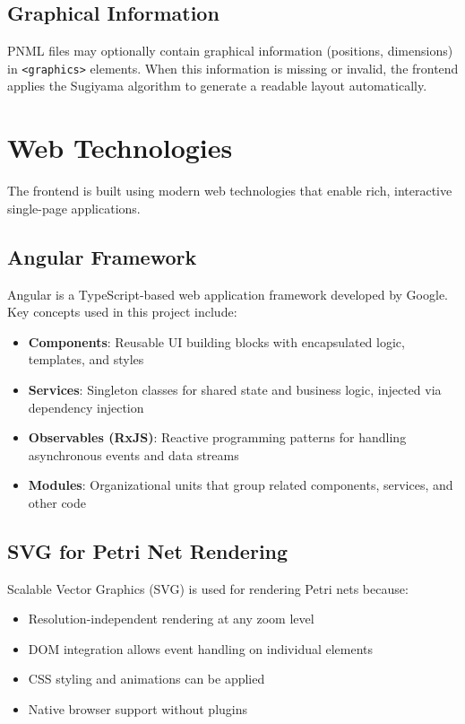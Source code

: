 \subsection{Graphical Information}

PNML files may optionally contain graphical information (positions, dimensions) in \texttt{<graphics>} elements. When this information is missing or invalid, the frontend applies the Sugiyama algorithm to generate a readable layout automatically.

\section{Web Technologies}
\label{sec:web-technologies}

The frontend is built using modern web technologies that enable rich, interactive single-page applications.

\subsection{Angular Framework}

Angular is a TypeScript-based web application framework developed by Google. Key concepts used in this project include:

\begin{itemize}
    \item \textbf{Components}: Reusable UI building blocks with encapsulated logic, templates, and styles
    \item \textbf{Services}: Singleton classes for shared state and business logic, injected via dependency injection
    \item \textbf{Observables (RxJS)}: Reactive programming patterns for handling asynchronous events and data streams
    \item \textbf{Modules}: Organizational units that group related components, services, and other code
\end{itemize}

\subsection{SVG for Petri Net Rendering}

Scalable Vector Graphics (SVG) is used for rendering Petri nets because:
\begin{itemize}
    \item Resolution-independent rendering at any zoom level
    \item DOM integration allows event handling on individual elements
    \item CSS styling and animations can be applied
    \item Native browser support without plugins
\end{itemize}

